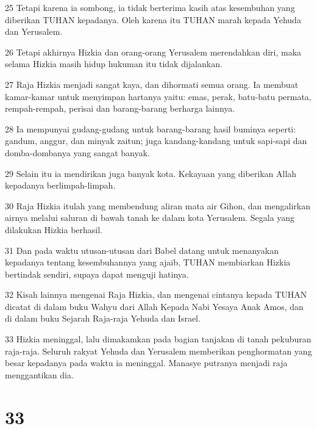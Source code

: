 \par 25 Tetapi karena ia sombong, ia tidak berterima kasih atas kesembuhan yang diberikan TUHAN kepadanya. Oleh karena itu TUHAN marah kepada Yehuda dan Yerusalem.
\par 26 Tetapi akhirnya Hizkia dan orang-orang Yerusalem merendahkan diri, maka selama Hizkia masih hidup hukuman itu tidak dijalankan.
\par 27 Raja Hizkia menjadi sangat kaya, dan dihormati semua orang. Ia membuat kamar-kamar untuk menyimpan hartanya yaitu: emas, perak, batu-batu permata, rempah-rempah, perisai dan barang-barang berharga lainnya.
\par 28 Ia mempunyai gudang-gudang untuk barang-barang hasil buminya seperti: gandum, anggur, dan minyak zaitun; juga kandang-kandang untuk sapi-sapi dan domba-dombanya yang sangat banyak.
\par 29 Selain itu ia mendirikan juga banyak kota. Kekayaan yang diberikan Allah kepadanya berlimpah-limpah.
\par 30 Raja Hizkia itulah yang membendung aliran mata air Gihon, dan mengalirkan airnya melalui saluran di bawah tanah ke dalam kota Yerusalem. Segala yang dilakukan Hizkia berhasil.
\par 31 Dan pada waktu utusan-utusan dari Babel datang untuk menanyakan kepadanya tentang kesembuhannya yang ajaib, TUHAN membiarkan Hizkia bertindak sendiri, supaya dapat menguji hatinya.
\par 32 Kisah lainnya mengenai Raja Hizkia, dan mengenai cintanya kepada TUHAN dicatat di dalam buku Wahyu dari Allah Kepada Nabi Yesaya Anak Amos, dan di dalam buku Sejarah Raja-raja Yehuda dan Israel.
\par 33 Hizkia meninggal, lalu dimakamkan pada bagian tanjakan di tanah pekuburan raja-raja. Seluruh rakyat Yehuda dan Yerusalem memberikan penghormatan yang besar kepadanya pada waktu ia meninggal. Manasye putranya menjadi raja menggantikan dia.

\chapter{33}

